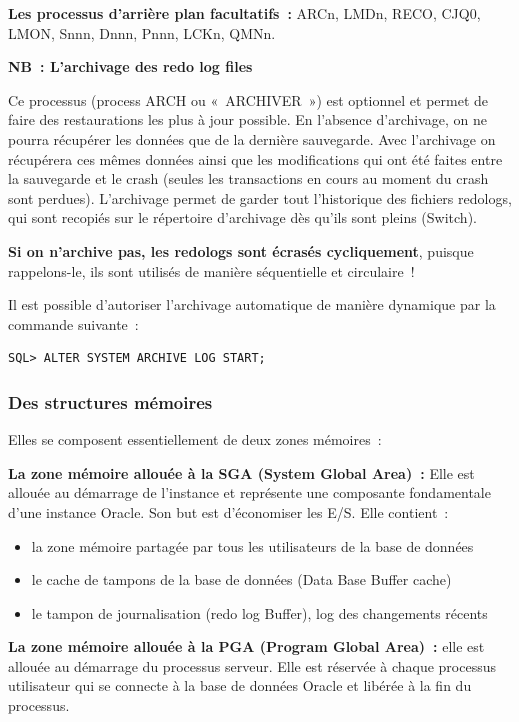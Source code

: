 \documentclass[12pt,a4paper]{report}
\begin{document}
\noindent\textbf{Les processus d'arrière plan facultatifs~:} ARCn, LMDn, RECO, CJQ0,
LMON, Snnn, Dnnn, Pnnn, LCKn, QMNn.

\medskip
\noindent\textbf{NB~: L'archivage des redo log files}

Ce processus (process ARCH ou «~ARCHIVER~») est optionnel et permet de faire des
restaurations les plus à jour possible. En l'absence d'archivage, on ne pourra
récupérer les données que de la dernière sauvegarde. Avec l'archivage on récupérera
ces mêmes données ainsi que les modifications qui ont été faites entre la sauvegarde
et le crash (seules les transactions en cours au moment du crash sont perdues).
L'archivage permet de garder tout l'historique des fichiers redologs, qui sont
recopiés sur le répertoire d'archivage dès qu'ils sont pleins (Switch).

\textbf{Si on n'archive pas, les redologs sont écrasés cycliquement}, puisque
rappelons-le, ils sont utilisés de manière séquentielle et circulaire~!

Il est possible d'autoriser l'archivage automatique de manière dynamique par la
commande suivante~:

\begin{lstlisting}
SQL> ALTER SYSTEM ARCHIVE LOG START;
\end{lstlisting}

\subsubsection{Des structures mémoires}

Elles se composent essentiellement de deux zones mémoires~:

\medskip
\noindent\textbf{La zone mémoire allouée à la SGA (System Global Area)~:}
Elle est allouée au démarrage de l'instance et représente une composante
fondamentale d'une instance Oracle. Son but est d'économiser les E/S. Elle
contient~:
\begin{itemize}[leftmargin=*]
  \item la zone mémoire partagée par tous les utilisateurs de la base de données
  \item le cache de tampons de la base de données (Data Base Buffer cache)
  \item le tampon de journalisation (redo log Buffer), log des changements récents
\end{itemize}

\noindent\textbf{La zone mémoire allouée à la PGA (Program Global Area)~:} elle est
allouée au démarrage du processus serveur. Elle est réservée à chaque processus
utilisateur qui se connecte à la base de données Oracle et libérée à la fin du
processus.
\end{document}
